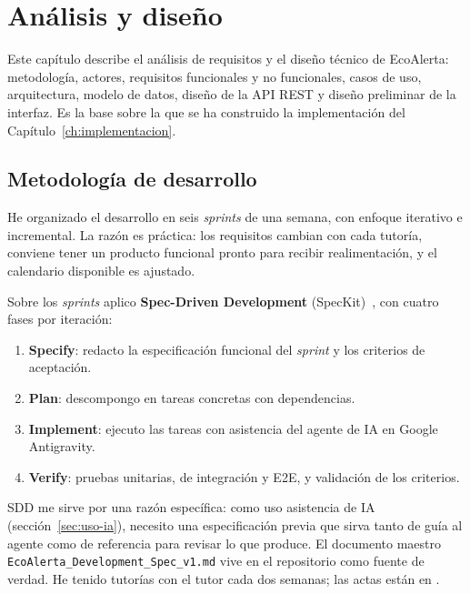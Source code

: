 \chapter{Análisis y diseño}
\label{ch:analisis-disenyo}

Este capítulo describe el análisis de requisitos y el diseño técnico de EcoAlerta: metodología, actores, requisitos funcionales y no funcionales, casos de uso, arquitectura, modelo de datos, diseño de la API REST y diseño preliminar de la interfaz. Es la base sobre la que se ha construido la implementación del Capítulo~\ref{ch:implementacion}.


\section{Metodología de desarrollo}
\label{sec:metodologia}

He organizado el desarrollo en seis \textit{sprints} de una semana, con enfoque iterativo e incremental. La razón es práctica: los requisitos cambian con cada tutoría, conviene tener un producto funcional pronto para recibir realimentación, y el calendario disponible es ajustado.

Sobre los \textit{sprints} aplico \textbf{Spec-Driven Development} (SpecKit)~\cite{speckit}, con cuatro fases por iteración:

\begin{enumerate}[leftmargin=1.2cm, itemsep=2pt]
  \item \textbf{Specify}: redacto la especificación funcional del \textit{sprint} y los criterios de aceptación.
  \item \textbf{Plan}: descompongo en tareas concretas con dependencias.
  \item \textbf{Implement}: ejecuto las tareas con asistencia del agente de IA en Google Antigravity.
  \item \textbf{Verify}: pruebas unitarias, de integración y E2E, y validación de los criterios.
\end{enumerate}

SDD me sirve por una razón específica: como uso asistencia de IA (sección~\ref{sec:uso-ia}), necesito una especificación previa que sirva tanto de guía al agente como de referencia para revisar lo que produce. El documento maestro \texttt{EcoAlerta\_Development\_Spec\_v1.md} vive en el repositorio como fuente de verdad. He tenido tutorías con el tutor cada dos semanas; las actas están en .


